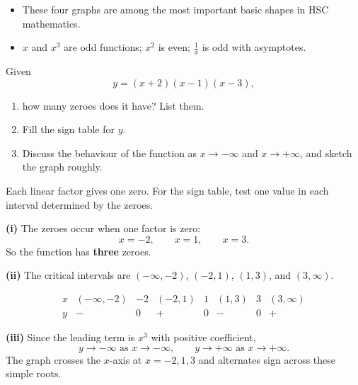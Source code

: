 \begin{takeaways}
\begin{itemize}[leftmargin=*]
\item These four graphs are among the most important basic shapes in HSC mathematics.
\item $x$ and $x^3$ are odd functions; $x^2$ is even; $\frac1x$ is odd with asymptotes.
\end{itemize}
\end{takeaways}

\begin{problem}
Given
\[
y=(x+2)(x-1)(x-3),
\]
\begin{enumerate}[label=(\roman*)]
\item how many zeroes does it have? List them.
\item Fill the sign table for $y$.
\item Discuss the behaviour of the function as $x\to -\infty$ and $x\to +\infty$, and sketch the graph roughly.
\end{enumerate}
\end{problem}

\begin{hint}
Each linear factor gives one zero. For the sign table, test one value in each interval determined by the zeroes.
\end{hint}

\begin{solution}
\textbf{(i)} The zeroes occur when one factor is zero:
\[
x=-2,\qquad x=1,\qquad x=3.
\]
So the function has \textbf{three} zeroes.

\textbf{(ii)} The critical intervals are $(-\infty,-2)$, $(-2,1)$, $(1,3)$, and $(3,\infty)$.

\[
\begin{array}{c|ccccccc}
x & (-\infty,-2) & -2 & (-2,1) & 1 & (1,3) & 3 & (3,\infty)\\ \hline
y & - & 0 & + & 0 & - & 0 & +
\end{array}
\]

\textbf{(iii)} Since the leading term is $x^3$ with positive coefficient,
\[
y\to -\infty \text{ as } x\to -\infty,
\qquad
y\to +\infty \text{ as } x\to +\infty.
\]
The graph crosses the $x$-axis at $x=-2,1,3$ and alternates sign across these simple roots.

\begin{center}
\end{center}
\end{solution}

